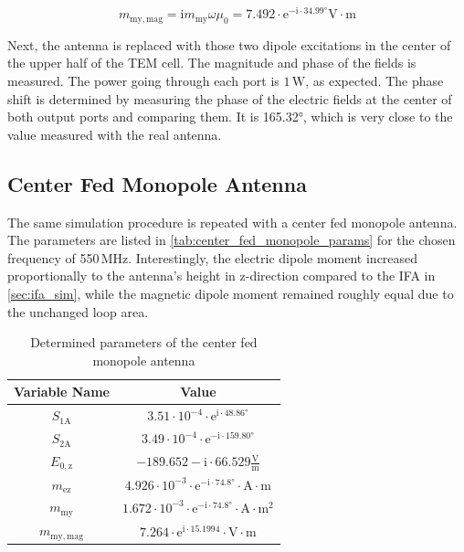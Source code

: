 \begin{equation}
    m_{\mathrm{my,mag}}=\mathrm{i}m_{\mathrm{my}}\omega\mu_0=7.492\cdot\mathrm{e}^{-\mathrm{i}\cdot34.99°}\mathrm{V\cdot m}
    \label{eqn:m_mymag_ifa}
\end{equation}

Next, the antenna is replaced with those two dipole excitations in the center of the upper half of the TEM cell. The magnitude and phase of the fields is measured. The power going through each port is $1\,\mathrm{W}$, as expected. The phase shift is determined by measuring the phase of the electric fields at the center of both output ports and comparing them. It is 165.32°, which is very close to the value measured with the real antenna.

\subsection{Center Fed Monopole Antenna}

The same simulation procedure is repeated with a center fed monopole antenna. The parameters are listed in \autoref{tab:center_fed_monopole_params} for the chosen frequency of 550\,MHz. Interestingly, the electric dipole moment increased proportionally to the antenna's height in z-direction compared to the IFA in \autoref{sec:ifa_sim}, while the magnetic dipole moment remained roughly equal due to the unchanged loop area.


\begin{table}[h]
    \centering
    \begin{tabular}{|c|c|}
        \hline
        Variable Name & Value\\\hline\hline
        $S_{1\mathrm{A}}$ & $3.51\cdot10^{-4}\cdot \mathrm{e}^{\mathrm{i}\cdot 48.86°}$\\\hline
         $S_{2\mathrm{A}}$&$3.49\cdot10^{-4}\cdot\mathrm{e}^{-\mathrm{i}\cdot 159.80°}$ \\\hline
         $E_{0,\mathrm{z}}$&$-189.652 -\mathrm{i}\cdot66.529\mathrm{\frac{V}{m}}$ \\\hline
         $m_{\mathrm{ez}}$&$4.926\cdot10^{-3}\cdot\mathrm{e}^{-\mathrm{i}\cdot74.8°}\cdot\mathrm{A\cdot m}$ \\\hline
         $m_{\mathrm{my}}$&$1.672\cdot10^{-3}\cdot\mathrm{e}^{-\mathrm{i}\cdot 74.8°}\cdot\mathrm{A\cdot m^2}$ \\\hline
         $m_{\mathrm{my,mag}}$&$7.264\cdot\mathrm{e}^{\mathrm{i}\cdot15.1994}\cdot\mathrm{V\cdot m}$ \\\hline
    \end{tabular}
    \caption{Determined parameters of the center fed monopole antenna}
    \label{tab:center_fed_monopole_params}
\end{table}


